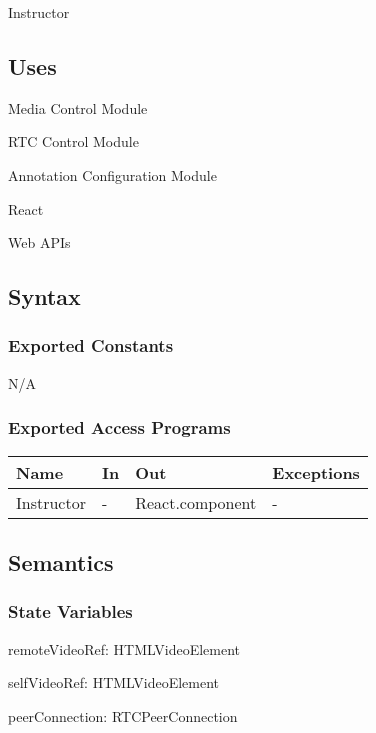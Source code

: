\documentclass[12pt, titlepage]{article}
\begin{document}
Instructor

\subsection{Uses}

\noindent Media Control Module

\noindent RTC Control Module

\noindent Annotation Configuration Module

\noindent React

\noindent Web APIs

\subsection{Syntax}

\subsubsection{Exported Constants}

N/A

\subsubsection{Exported Access Programs}

\begin{center}
  \begin{tabular}{p{4cm} p{4cm} p{4cm} p{2cm}}
    \hline
    \textbf{Name}    & \textbf{In} & \textbf{Out}          & \textbf{Exceptions} \\
    \hline
    Instructor & -     & React.component & -             \\
    \hline
  \end{tabular}
\end{center}

\subsection{Semantics}

\subsubsection{State Variables}

\noindent remoteVideoRef: HTMLVideoElement

\noindent selfVideoRef: HTMLVideoElement

\noindent peerConnection: RTCPeerConnection
\end{document}
